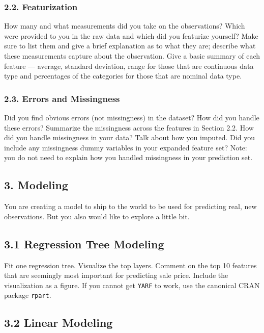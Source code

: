 \documentclass[12pt]{article}
\begin{document}
\begin{tcolorbox}
\subsubsection*{2.2. Featurization}

How many and what measurements did you take on the observations? Which were provided to you in the raw data and which did you featurize yourself? Make sure to list them and give a brief explanation as to what they are; describe what these measurements capture about the observation. Give a basic summary of each feature --- average, standard deviation, range for those that are continuous data type and percentages of the categories for those that are nominal data type.


\subsubsection*{2.3. Errors and Missingness}

Did you find obvious errors (not missingness) in the dataset? How did you handle these errors? Summarize the missingness across the features in Section 2.2. How did you handle missingness in your data? Talk about how you imputed. Did you include any missingness dummy variables in your expanded feature set? Note: you do not need to explain how you handled missingness in your prediction set.


\subsection*{3. Modeling}

You are creating a model to ship to the world to be used for predicting real, new observations. But you also would like to explore a little bit.

\subsection*{3.1 Regression Tree Modeling}

Fit one regression tree. Visualize the top layers. Comment on the top 10 features that are seemingly most important for predicting sale price. Include the visualization as a figure.  If you cannot get \texttt{YARF} to work, use the canonical CRAN package \texttt{rpart}.

\subsection*{3.2 Linear Modeling}


\end{tcolorbox}
\end{document}
